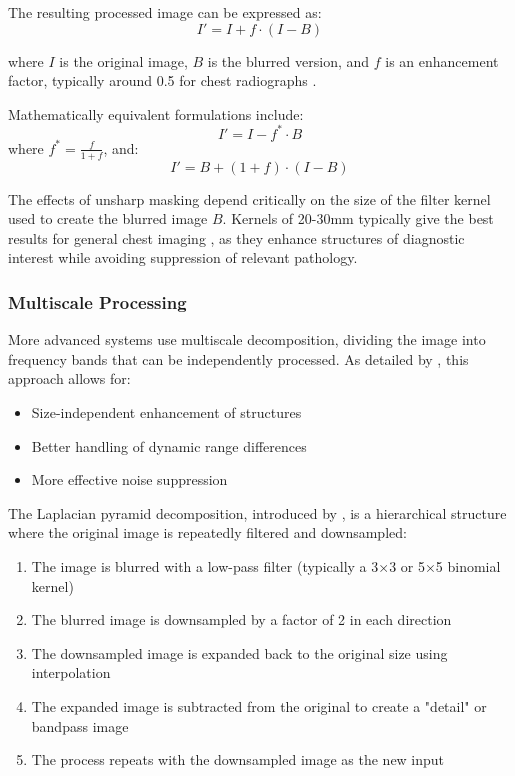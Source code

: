\documentclass[nomenclature, english, bibtex]{kththesis}
\numberwithin{listing}{chapter}
\begin{document}
The resulting processed image can be expressed as:
\begin{equation}
I' = I + f \cdot (I - B)
\end{equation}

where $I$ is the original image, $B$ is the blurred version, and $f$ is an enhancement factor, typically around 0.5 for chest radiographs \cite{prokop2003principles}.

Mathematically equivalent formulations include:
\begin{equation}
I' = I - f^* \cdot B
\end{equation}
where $f^* = \frac{f}{1+f}$, and:
\begin{equation}
I' = B + (1+f) \cdot (I - B)
\end{equation}

The effects of unsharp masking depend critically on the size of the filter kernel used to create the blurred image $B$. Kernels of 20-30mm typically give the best results for general chest imaging \cite{prokop1993improved}, as they enhance structures of diagnostic interest while avoiding suppression of relevant pathology.

\subsubsection{Multiscale Processing}
More advanced systems use multiscale decomposition, dividing the image into frequency bands that can be independently processed. As detailed by \cite{stahl2000digital}, this approach allows for:
\begin{itemize}
    \item Size-independent enhancement of structures
    \item Better handling of dynamic range differences
    \item More effective noise suppression
\end{itemize}

The Laplacian pyramid decomposition, introduced by \cite{burt1983laplacian}, is a hierarchical structure where the original image is repeatedly filtered and downsampled:

\begin{enumerate}
    \item The image is blurred with a low-pass filter (typically a 3×3 or 5×5 binomial kernel)
    \item The blurred image is downsampled by a factor of 2 in each direction
    \item The downsampled image is expanded back to the original size using interpolation
    \item The expanded image is subtracted from the original to create a "detail" or bandpass image
    \item The process repeats with the downsampled image as the new input
\end{enumerate}
\end{document}
